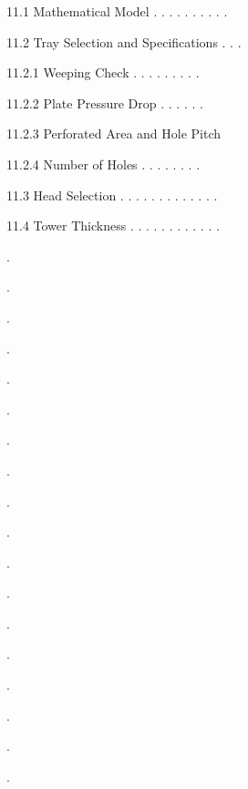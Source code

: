 \documentclass[a4paper,portrait,12pt]{article}
\begin{document}
\begin{flushleft}
11.1 Mathematical Model . . . . . . . . . .
\end{flushleft}


\begin{flushleft}
11.2 Tray Selection and Specifications . . .
\end{flushleft}


\begin{flushleft}
11.2.1 Weeping Check . . . . . . . . .
\end{flushleft}


\begin{flushleft}
11.2.2 Plate Pressure Drop . . . . . .
\end{flushleft}


\begin{flushleft}
11.2.3 Perforated Area and Hole Pitch
\end{flushleft}


\begin{flushleft}
11.2.4 Number of Holes . . . . . . . .
\end{flushleft}


\begin{flushleft}
11.3 Head Selection . . . . . . . . . . . . .
\end{flushleft}


\begin{flushleft}
11.4 Tower Thickness . . . . . . . . . . . .
\end{flushleft}





.


.


.


.


.


.


.


.





.


.


.


.


.


.


.


.





.


.
\end{document}
